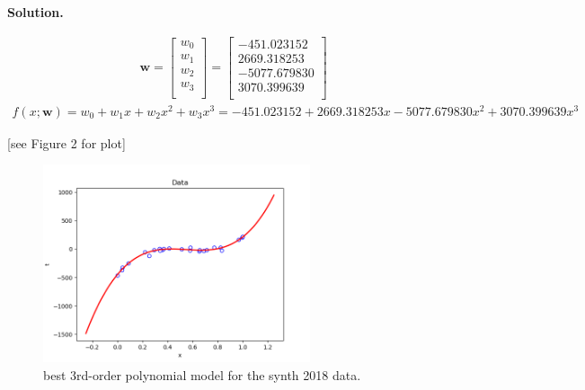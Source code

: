 \documentclass[10pt]{article}
\begin{document}
\begin{itemize}
{\bf Solution.} 

\begin{eqnarray*}
\mathbf{w} = 
\begin{bmatrix}
    w_0\\[0.3em]
    w_1\\[0.3em]
    w_2\\[0.3em]
    w_3\\[0.3em]
\end{bmatrix} =
\begin{bmatrix}
    -451.023152\\[0.3em]
    2669.318253\\[0.3em]
    -5077.679830\\[0.3em]
    3070.399639\\[0.3em]
\end{bmatrix}
\end{eqnarray*}
\begin{eqnarray*}
f(x; \mathbf{w}) = w_0 + w_1 x + w_2 x^2 + w_3 x^3 =
-451.023152 + 2669.318253 x - 5077.679830 x^2 + 3070.399639 x^3
\end{eqnarray*}

\begin{center}
[see Figure 2 for plot]
\end{center}

\begin{figure}
\centering
\includegraphics[width=0.7\textwidth]{problem3.png}
\caption{\label{fig:linearModelSynth}best 3rd-order polynomial model for the synth 2018 data.}
\end{figure}


\end{itemize}
\end{document}
